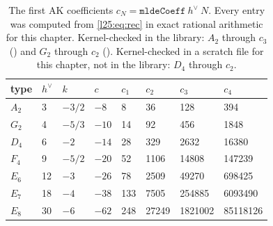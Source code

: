 \begin{table}[ht]\centering\small
\caption{The first AK coefficients $c_N=\mathtt{mldeCoeff}\ h^\vee\ N$. Every entry was computed from
\eqref{l25:eq:rec} in exact rational arithmetic for this chapter. Kernel-checked in the library: $A_2$ through $c_3$
() and $G_2$ through $c_2$ (). Kernel-checked in a scratch file for
this chapter, not in the library: $D_4$ through $c_2$.}\label{l25:tab:cN}
\begin{tabular}{llllllll}
\toprule
type & $h^\vee$ & $k$ & $c$ & $c_1$ & $c_2$ & $c_3$ & $c_4$\\
\midrule
$A_2$ & 3 & $-3/2$ & $-8$ & 8 & 36 & 128 & 394\\
$G_2$ & 4 & $-5/3$ & $-10$ & 14 & 92 & 456 & 1848\\
$D_4$ & 6 & $-2$ & $-14$ & 28 & 329 & 2632 & 16380\\
$F_4$ & 9 & $-5/2$ & $-20$ & 52 & 1106 & 14808 & 147239\\
$E_6$ & 12 & $-3$ & $-26$ & 78 & 2509 & 49270 & 698425\\
$E_7$ & 18 & $-4$ & $-38$ & 133 & 7505 & 254885 & 6093490\\
$E_8$ & 30 & $-6$ & $-62$ & 248 & 27249 & 1821002 & 85118126\\
\bottomrule
\end{tabular}
\end{table}

